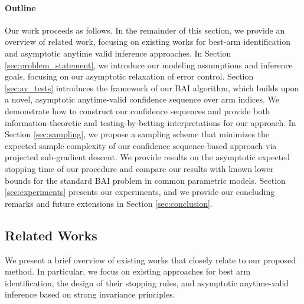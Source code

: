 \documentclass{article}
\begin{document}
\paragraph{Outline} Our work proceeds as follows. In the remainder of this section, we provide an overview of related work, focusing on existing works for best-arm identification and asymptotic anytime valid inference approaches. In Section \ref{sec:problem_statement}, we introduce our modeling assumptions and inference goals, focusing on our asymptotic relaxation of error control. Section \ref{sec:av_tests} introduces the framework of our BAI algorithm, which builds upon a novel, asymptotic anytime-valid confidence sequence over arm indices. We demonstrate how to construct our confidence sequences and provide both information-theoretic and testing-by-betting \citep{testing_as_betting} interpretations for our approach. In Section \ref{sec:sampling}, we propose a sampling scheme that minimizes the expected sample complexity of our confidence sequence-based approach via projected sub-gradient descent. We provide results on the asymptotic expected stopping time of our procedure and compare our results with known lower bounds for the standard BAI problem in common parametric models. Section \ref{sec:experiments} presents our experiments, and we provide our concluding remarks and future extensions in Section \ref{sec:conclusion}. 


\subsection{Related Works}

We present a brief overview of existing works that closely relate to our proposed method. In particular, we focus on existing approaches for best arm identification, the design of their stopping rules, and asymptotic anytime-valid inference based on strong invariance principles. 
\end{document}
